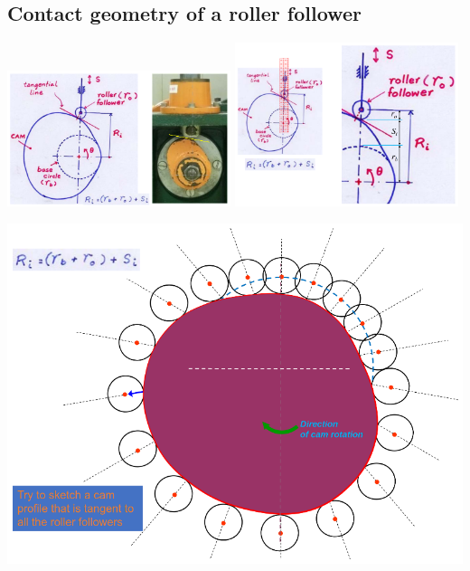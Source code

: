 \documentclass[11pt]{article}
\begin{document}
\subsection{Contact geometry of a roller follower}
\label{sec:org3d0a9d6}
\begin{center}
\includegraphics[width=0.49\textwidth]{./images/contact-geometry-of-roller-follower-pic-1.png}
\includegraphics[width=0.49\textwidth]{./images/contact-geometry-of-roller-follower-pic-2.png}
\end{center}

\begin{center}
\includegraphics[width=.9\linewidth]{./images/roller-follower-and-cam-diagram.png}
\end{center}
\end{document}
